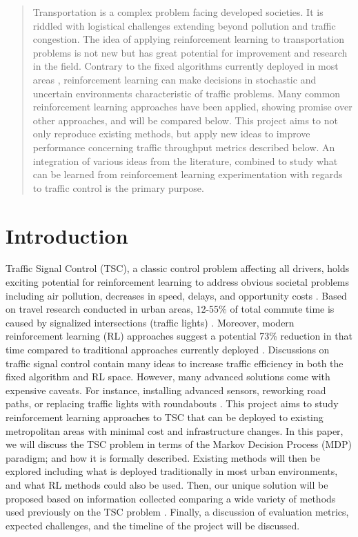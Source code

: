 \documentclass[letterpaper]{article} %
\begin{document}

\begin{abstract}
Transportation is a complex problem facing developed societies.
It is riddled with logistical challenges extending beyond pollution and traffic congestion.
The idea of applying reinforcement learning to transportation problems is not new but has great potential for improvement and research in the field.
Contrary to the fixed algorithms currently deployed in most areas \cite{Chaudhuri2021}, reinforcement learning can make decisions in stochastic and uncertain environments characteristic of traffic problems.
Many common reinforcement learning approaches have been applied, showing promise over other approaches, and will be compared below.
This project aims to not only reproduce existing methods, but apply new ideas to improve performance concerning traffic throughput metrics described below.
An integration of various ideas from the literature, combined to study what can be learned from reinforcement learning experimentation with regards to traffic control is the primary purpose.
\end{abstract}

\section{Introduction}
Traffic Signal Control (TSC), a classic control problem affecting all drivers, holds exciting potential for reinforcement learning to address obvious societal problems including air pollution, decreases in speed, delays, and opportunity costs \cite{Almeida2022MultiagentRL}.
Based on travel research conducted in urban areas, 12-55\% of total commute time is caused by signalized intersections (traffic lights) \cite{ault2021reinforcement}.
Moreover, modern reinforcement learning (RL) approaches suggest a potential 73\% reduction in that time compared to traditional approaches currently deployed \cite{ault2021reinforcement}.
Discussions on traffic signal control contain many ideas to increase traffic efficiency in both the fixed algorithm and RL space.
However, many advanced solutions come with expensive caveats. For instance, installing advanced sensors, reworking road paths, or replacing traffic lights with roundabouts \cite{DBLP:journals/corr/abs-2004-04778}.
This project aims to study reinforcement learning approaches to TSC that can be deployed to existing metropolitan areas with minimal cost and infrastructure changes.
In this paper, we will discuss the TSC problem in terms of the Markov Decision Process (MDP) paradigm; and how it is formally described.
Existing methods will then be explored including what is deployed traditionally in most urban environments, and what RL methods could also be used.
Then, our unique solution will be proposed based on information collected comparing a wide variety of methods used previously on the TSC problem \cite{hafiz2020deep} \cite{ault2021reinforcement} \cite{Ghanadbashi2023}.
Finally, a discussion of evaluation metrics, expected challenges, and the timeline of the project will be discussed.
\end{document}
